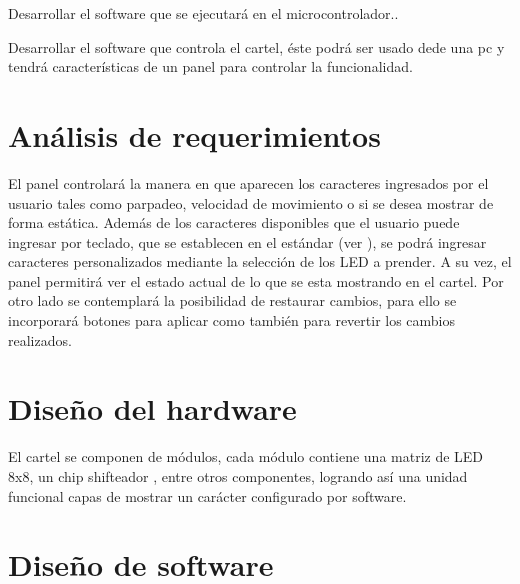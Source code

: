 Desarrollar el software que se ejecutará en el microcontrolador..

Desarrollar el software que controla el cartel, éste podrá ser usado dede una pc y tendrá características de un panel para controlar la funcionalidad.

\section{Análisis de requerimientos}



El panel controlará la manera en que aparecen los caracteres ingresados por el usuario tales como parpadeo, velocidad de movimiento o si se desea mostrar de forma estática. Además de los caracteres disponibles que el usuario puede ingresar por teclado, que se establecen en el estándar (ver \cite{CodifChar}), se podrá ingresar caracteres personalizados mediante la selección de los LED a prender. A su vez, el panel permitirá ver el estado actual de lo que se esta mostrando en el cartel. Por otro lado se contemplará la posibilidad de restaurar cambios, para ello se incorporará botones para aplicar como también para revertir los cambios realizados.


\section{Diseño del hardware}
El cartel se componen de módulos, cada módulo contiene una matriz de LED 8x8, un chip shifteador \cite{MAX7219}, entre otros componentes, logrando así una unidad funcional capas de mostrar un carácter configurado por software.


\section{Diseño de software}

